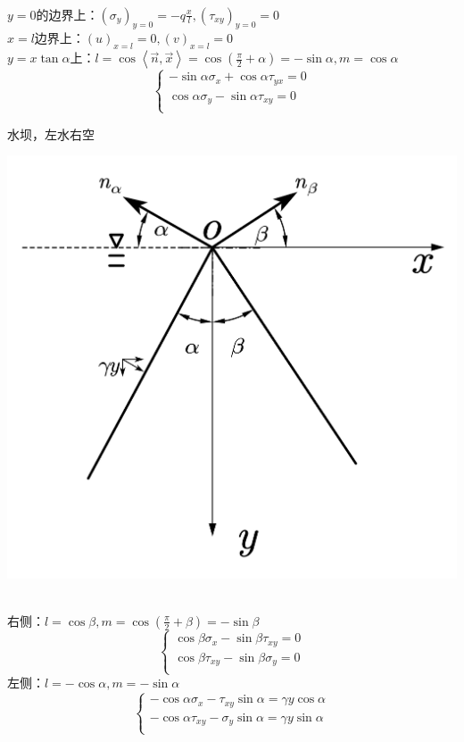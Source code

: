 \begin{remark}
	\quad\\
	$y=0$的边界上：$\left( \sigma _y \right) _{y=0}=-q\frac{x}{l},\left( \tau _{xy} \right) _{y=0}=0$\\
	$x=l$边界上：$\left( u \right) _{x=l}=0,\left( v \right) _{x=l}=0$\\
	$y=x\tan \alpha$上：$l=\cos \left< \vec{n},\vec{x} \right> =\cos \left( \frac{\pi}{2}+\alpha \right) =-\sin \alpha ,m=\cos \alpha $
	\[\begin{cases}
	-\sin \alpha \sigma _x+\cos \alpha \tau _{yx}=0\\
	\cos \alpha \sigma _y-\sin \alpha \tau _{xy}=0\\
	\end{cases}\]
\end{remark}
\begin{example}
		水坝，左水右空
\end{example}
\centerline{\includegraphics[scale=0.6]{figure/2-3.png}}
\begin{remark}
	\quad\\
	右侧：$l=\cos \beta ,m=\cos \left( \frac{\pi}{2}+\beta \right) =-\sin \beta $\[\begin{cases}
	\cos \beta \sigma _x-\sin \beta \tau _{xy}=0\\
	\cos \beta \tau _{xy}-\sin \beta \sigma _y=0\\
	\end{cases}\]
	左侧：$l=-\cos \alpha ,m=-\sin \alpha $\[\begin{cases}
	-\cos \alpha \sigma _x-\tau _{xy}\sin \alpha =\gamma y\cos \alpha\\
	-\cos \alpha \tau _{xy}-\sigma _y\sin \alpha =\gamma y\sin \alpha\\
	\end{cases}\]	
\end{remark}

